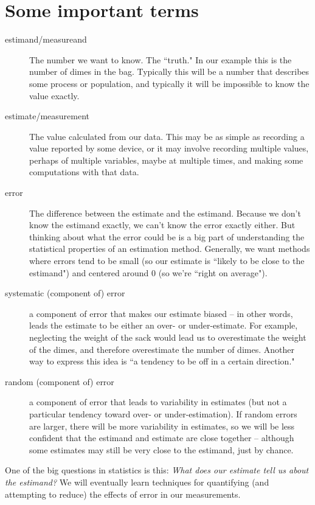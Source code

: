 \documentclass[twoside]{book}\usepackage[]{graphicx}\usepackage[]{xcolor}
\newcounter{example}[section]
\begin{document}
\section*{Some important terms}

\begin{description}
	\item[estimand/measureand]{ The number we want to know.  The ``truth." 
    In our example this is the number
		of dimes in the bag.  Typically this will be a number that describes some process
		or population, and typically it will be impossible to know the value exactly.}

	\item[estimate/measurement]{The value calculated from our data.  This may be 
		as simple as recording a value reported by some device, or it may involve
		recording multiple values, perhaps of multiple variables, maybe at multiple times,
    and making some computations with that data.}  

	\item[error]{The difference between the estimate and the estimand.  Because we don't
		know the estimand exactly, we can't know the error exactly either.  But thinking
		about what the error could be is a big part of understanding the statistical
		properties of an estimation method.  Generally, we want methods where errors 
		tend to be small (so our estimate is ``likely to be close to the estimand")
		and centered around 0 (so we're ``right on average").}
	\item
		[systematic (component of) error]{a component of error that makes our estimate
    biased -- in other words, leads the estimate to be either an over- or under-estimate.
    For example, neglecting the weight of the sack would
		lead us to overestimate the weight of the dimes, and therefore overestimate 
		the number of dimes.  Another way to express this idea is ``a tendency to be off in
		a certain direction."}
	\item
		[random (component of) error]{a component of error that leads to variability
		in estimates (but not a particular tendency toward over- or under-estimation).
    If random errors are larger, there will be more variability 
		in estimates, so we will be less confident that the estimand and estimate are 
		close together -- although some estimates may still be very close to the estimand,
    just by chance.}
\end{description}

One of the big questions in statistics is this:  
\emph{What does our estimate tell us about the estimand?}
We will eventually learn techniques for quantifying (and attempting to reduce)
the effects of error in our measurements. 
\end{document}
